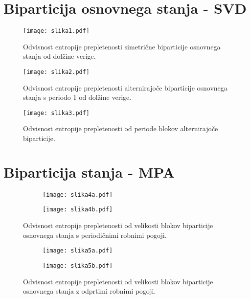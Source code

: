 \documentclass[a4paper]{article}
\begin{document}
    \section{Biparticija osnovnega stanja - SVD} 

    \begin{figure}
        \centering
        \texttt{[image: slika1.pdf]}
        \caption{Odvisnost entropije prepletenosti simetrične biparticije osnovnega stanja od dolžine verige.}
        \label{slika1}
    \end{figure}

    \begin{figure}
        \centering
        \texttt{[image: slika2.pdf]}
        \caption{Odvisnost entropije prepletenosti alternirajoče biparticije osnovnega stanja s periodo 1 od dolžine verige.}
        \label{slika2}
    \end{figure}

    \begin{figure}
        \centering
        \texttt{[image: slika3.pdf]}
        \caption{Odvisnost entropije prepletenosti od periode blokov alternirajoče biparticije.}
        \label{slika3}
    \end{figure}

    \section{Biparticija stanja - MPA}

    \begin{figure}
        \centering
        \begin{subfigure}{\textwidth}
            \texttt{[image: slika4a.pdf]}
        \end{subfigure}
        \begin{subfigure}{\textwidth}
            \texttt{[image: slika4b.pdf]}
        \end{subfigure}
        \caption{Odvisnost entropije prepletenosti od velikosti blokov biparticije osnovnega stanja s periodičnimi robnimi pogoji.}
        \label{slika4}
    \end{figure}

    \begin{figure}
        \centering
        \begin{subfigure}{\textwidth}
            \texttt{[image: slika5a.pdf]}
        \end{subfigure}
        \begin{subfigure}{\textwidth}
            \texttt{[image: slika5b.pdf]}
        \end{subfigure}
        \caption{Odvisnost entropije prepletenosti od velikosti blokov biparticije osnovnega stanja z odprtimi robnimi pogoji.}
        \label{slika5}
    \end{figure}
\end{document}
